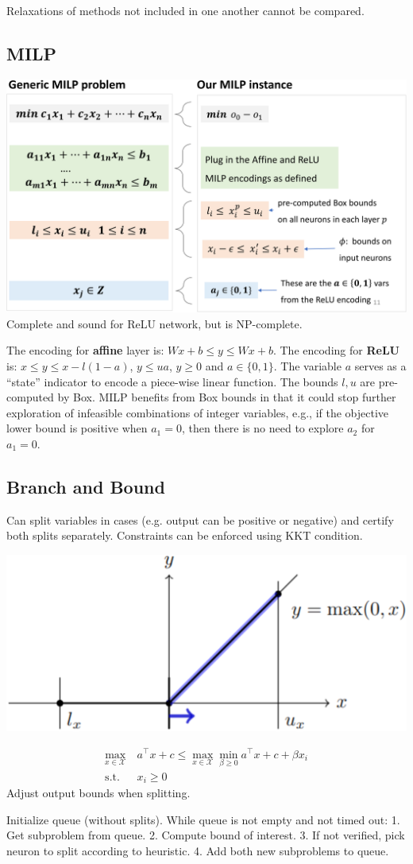 Relaxations of methods not included in one another cannot be compared.

\subsection*{MILP}
\includegraphics[width=1\linewidth]{img/milp.png}
Complete and sound for ReLU network, but is NP-complete.

The encoding for \textbf{affine} layer is: $Wx+b\le y\le Wx+b$. The encoding for \textbf{ReLU} is: $x\leq y\leq x-l(1-a)$,  $y\le ua$, $y\ge 0$ and $a\in\{0,1\}$. The variable $a$ serves as a ``state'' indicator to encode a piece-wise linear function. The bounds $l,u$ are pre-computed by Box. MILP benefits from Box bounds in that it could stop further exploration of infeasible combinations of integer variables, e.g., if the objective lower bound is positive when $a_1=0$, then there is no need to explore $a_2$ for $a_1=0$.

\subsection*{Branch and Bound}
Can split variables in cases (e.g.  output can be positive or negative) and certify both splits separately. Constraints can be enforced using KKT condition.
\begin{center}
    \includegraphics[width=.6\linewidth]{img/bnb.png}
\end{center}
\begin{equation*}
    \begin{split}
        \max_{x\in\mathcal{X}} \  &a^\top x+c\leq \max_{x\in\mathcal{X}}\min_{\beta\geq0}a^\top x+c+\beta x_i \\[-2mm]
        \text{s.t.} \ \ \        &  x_i\geq0
    \end{split}
\end{equation*}
\Warning Adjust output bounds when splitting.

Initialize queue (without splits). While queue is not empty and not timed out:
1. Get subproblem from queue.
2. Compute bound of interest.
3. If not verified, pick neuron to split according to heuristic.
4. Add both new subproblems to queue.
